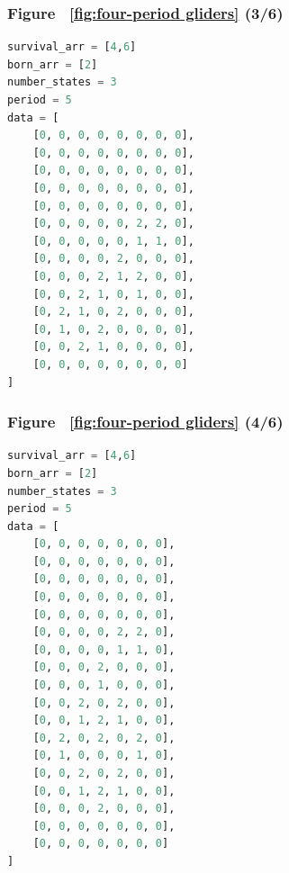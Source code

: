 \documentclass[12pt]{article}
\numberwithin{figure}{section} %
\begin{document}
\noindent\begin{minipage}{.50\textwidth}
\subsubsection{Figure ~\ref{fig:four-period gliders} (3/6)}
\label{subsubsection:four-period gliders(3/6)}
\begin{lstlisting}[language = Python]
survival_arr = [4,6]
born_arr = [2]
number_states = 3
period = 5
data = [
    [0, 0, 0, 0, 0, 0, 0, 0],
    [0, 0, 0, 0, 0, 0, 0, 0],
    [0, 0, 0, 0, 0, 0, 0, 0],
    [0, 0, 0, 0, 0, 0, 0, 0],
    [0, 0, 0, 0, 0, 0, 0, 0],
    [0, 0, 0, 0, 0, 2, 2, 0],
    [0, 0, 0, 0, 0, 1, 1, 0],
    [0, 0, 0, 0, 2, 0, 0, 0],
    [0, 0, 0, 2, 1, 2, 0, 0],
    [0, 0, 2, 1, 0, 1, 0, 0],
    [0, 2, 1, 0, 2, 0, 0, 0],
    [0, 1, 0, 2, 0, 0, 0, 0],
    [0, 0, 2, 1, 0, 0, 0, 0],
    [0, 0, 0, 0, 0, 0, 0, 0]
]
\end{lstlisting}
\end{minipage}\hfill
\begin{minipage}{.45\textwidth}
\subsubsection{Figure ~\ref{fig:four-period gliders} (4/6)}
\label{subsubsection:four-period gliders(4/6)}
\begin{lstlisting}[language = Python]
survival_arr = [4,6]
born_arr = [2]
number_states = 3
period = 5
data = [
    [0, 0, 0, 0, 0, 0, 0],
    [0, 0, 0, 0, 0, 0, 0],
    [0, 0, 0, 0, 0, 0, 0],
    [0, 0, 0, 0, 0, 0, 0],
    [0, 0, 0, 0, 0, 0, 0],
    [0, 0, 0, 0, 2, 2, 0],
    [0, 0, 0, 0, 1, 1, 0],
    [0, 0, 0, 2, 0, 0, 0],
    [0, 0, 0, 1, 0, 0, 0],
    [0, 0, 2, 0, 2, 0, 0],
    [0, 0, 1, 2, 1, 0, 0],
    [0, 2, 0, 2, 0, 2, 0],
    [0, 1, 0, 0, 0, 1, 0],
    [0, 0, 2, 0, 2, 0, 0],
    [0, 0, 1, 2, 1, 0, 0],
    [0, 0, 0, 2, 0, 0, 0],
    [0, 0, 0, 0, 0, 0, 0],
    [0, 0, 0, 0, 0, 0, 0]
]
\end{lstlisting}
\end{minipage}
\end{document}
